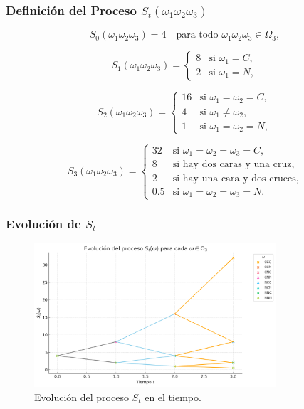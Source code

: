\begin{frame}
    \frametitle{Definición del Proceso \( S_t(\omega_1 \omega_2 \omega_3) \)}
    
    \[
    S_0(\omega_1 \omega_2 \omega_3) = 4 \quad \text{para todo } \omega_1 \omega_2 \omega_3 \in \Omega_3,
    \]
    
    \[
    S_1(\omega_1 \omega_2 \omega_3) =
    \begin{cases}
        8 & \text{si } \omega_1 = C, \\
        2 & \text{si } \omega_1 = N,
    \end{cases}
    \]
    
    \[
    S_2(\omega_1 \omega_2 \omega_3) =
    \begin{cases}
        16 & \text{si } \omega_1 = \omega_2 = C, \\
        4 & \text{si } \omega_1 \ne \omega_2, \\
        1 & \text{si } \omega_1 = \omega_2 = N,
    \end{cases}
    \]
    
    \[
    S_3(\omega_1 \omega_2 \omega_3) =
    \begin{cases}
        32 & \text{si } \omega_1 = \omega_2 = \omega_3 = C, \\
        8 & \text{si hay dos caras y una cruz}, \\
        2 & \text{si hay una cara y dos cruces}, \\
        0.5 & \text{si } \omega_1 = \omega_2 = \omega_3 = N.
    \end{cases}
    \]

\end{frame}


\begin{frame}
    \frametitle{Evolución de $S_t$}
    \begin{figure}
        \centering
        \includegraphics[width=0.8\textwidth]{img/cap2/S_t.jpg}
        \caption{Evolución del proceso $S_t$ en el tiempo.}
        \label{fig:evolucion}
    \end{figure}
\end{frame}

